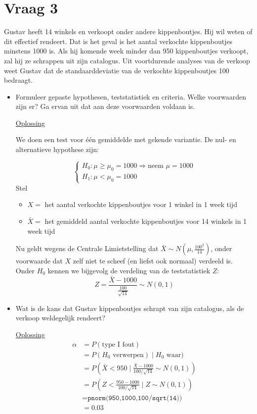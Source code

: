 \documentclass[kulak]{kulakarticle} %
\begin{document}
\newpage

\section*{Vraag 3}
Gustav heeft 14 winkels en verkoopt onder andere kippenboutjes. Hij wil weten of dit effectief rendeert. Dat is het geval is het aantal verkochte kippenboutjes minstens 1000 is. Als hij komende week minder dan 950 kippenboutjes verkoopt, zal hij ze schrappen uit zijn catalogus. Uit voortdurende analyses van de verkoop weet Gustav dat de standaarddeviatie van de verkochte kippenboutjes 100 bedraagt.

\begin{itemize}
	\item Formuleer gepaste hypothesen, teststatistiek en criteria. Welke voorwaarden zijn er? Ga ervan uit dat aan deze voorwaarden voldaan is.

	\underline{Oplossing}

	We doen een test voor één gemiddelde met gekende variantie. De nul- en alternatieve hypothese zijn:

	\[\begin{cases}
		H_0: \mu \geq \mu_0 = 1000 \Rightarrow \text{neem } \mu = 1000 \\
		H_1: \mu < \mu_0 = 1000
	\end{cases}\]
	Stel
	\begin{itemize}
		\item \(X=\) het aantal verkochte kippenboutjes voor 1 winkel in 1 week tijd
		\item \(\bar{X}=\) het gemiddeld aantal verkochte kippenboutjes voor 14 winkels in 1 week tijd
	\end{itemize}

	Nu geldt wegens de Centrale Limietstelling dat \(\bar{X}\sim N\left(\mu,\frac{100^2}{14}\right)\), onder voorwaarde dat \(X\) zelf niet te scheef (en liefst ook normaal) verdeeld is.
	\\

	Onder \(H_0\) kennen we bijgevolg de verdeling van de teststatistiek \(Z\): \[Z = \frac{\bar{X}-1000}{\frac{100}{\sqrt{14}}}\sim N(0,1)\]

	\item Wat is de kans dat Gustav kippenboutjes schrapt van zijn catalogus, als de verkoop weldegelijk rendeert?

	\underline{Oplossing}
	\begin{align*}
		\alpha & = P(\text{type I fout})                                                        \\
		& = P(H_0 \text{ verwerpen}) \mid H_0 \text{ waar})                              \\
		& = P\left(\bar{X}<950 \mid \frac{\bar{X}-1000}{100/\sqrt{14}}\sim N(0,1)\right) \\
		& = P\left(Z<\frac{950-1000}{100/\sqrt{14}} \mid Z \sim N(0,1) \right)                  \\
		& = \texttt{pnorm(950,1000,100/sqrt(14))}\\
		& = 0.03
	\end{align*}


\end{itemize}
\end{document}
